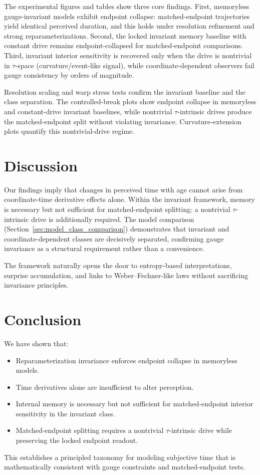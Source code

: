\documentclass[11pt]{article}
\begin{document}






The experimental figures and tables show three core findings. First, memoryless gauge-invariant models exhibit endpoint collapse: matched-endpoint trajectories yield identical perceived duration, and this holds under resolution refinement and strong reparameterizations. Second, the locked invariant memory baseline with constant drive remains endpoint-collapsed for matched-endpoint comparisons. Third, invariant interior sensitivity is recovered only when the drive is nontrivial in $\tau$-space (curvature/event-like signal), while coordinate-dependent observers fail gauge consistency by orders of magnitude.

Resolution scaling and warp stress tests confirm the invariant baseline and the class separation. The controlled-break plots show endpoint collapse in memoryless and constant-drive invariant baselines, while nontrivial $\tau$-intrinsic drives produce the matched-endpoint split without violating invariance. Curvature-extension plots quantify this nontrivial-drive regime.

\section{Discussion}

Our findings imply that changes in perceived time with age cannot arise from coordinate-time derivative effects alone. Within the invariant framework, memory is necessary but not sufficient for matched-endpoint splitting: a nontrivial $\tau$-intrinsic drive is additionally required. The model comparison (Section~\ref{sec:model_class_comparison}) demonstrates that invariant and coordinate-dependent classes are decisively separated, confirming gauge invariance as a structural requirement rather than a convenience.

The framework naturally opens the door to entropy-based interpretations, surprise accumulation, and links to Weber--Fechner-like laws without sacrificing invariance principles.

\section{Conclusion}

We have shown that:
\begin{itemize}
\item Reparameterization invariance enforces endpoint collapse in memoryless models.
\item Time derivatives alone are insufficient to alter perception.
\item Internal memory is necessary but not sufficient for matched-endpoint interior sensitivity in the invariant class.
\item Matched-endpoint splitting requires a nontrivial $\tau$-intrinsic drive while preserving the locked endpoint readout.
\end{itemize}

This establishes a principled taxonomy for modeling subjective time that is mathematically consistent with gauge constraints and matched-endpoint tests.

\bigskip
\newpage


\end{document}
